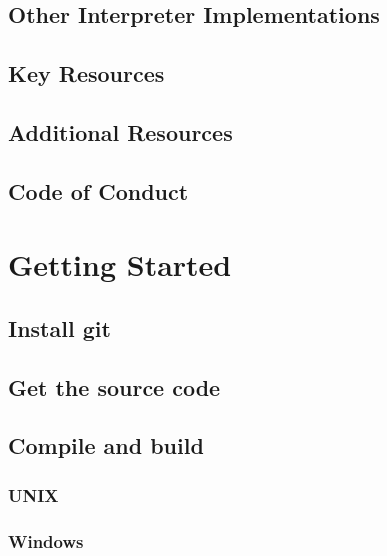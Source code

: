 \documentclass[]{book}
\begin{document}
\hypertarget{other-interpreter-implementations}{%
\section{Other Interpreter Implementations}\label{other-interpreter-implementations}}

\hypertarget{key-resources}{%
\section{Key Resources}\label{key-resources}}

\hypertarget{additional-resources}{%
\section{Additional Resources}\label{additional-resources}}

\hypertarget{code-of-conduct}{%
\section{Code of Conduct}\label{code-of-conduct}}

\hypertarget{getting-started}{%
\chapter{Getting Started}\label{getting-started}}

\hypertarget{install-git}{%
\section{Install git}\label{install-git}}

\hypertarget{get-the-source-code}{%
\section{Get the source code}\label{get-the-source-code}}

\hypertarget{compile-and-build}{%
\section{Compile and build}\label{compile-and-build}}

\hypertarget{unix}{%
\subsection{UNIX}\label{unix}}

\hypertarget{windows}{%
\subsection{Windows}\label{windows}}
\end{document}
